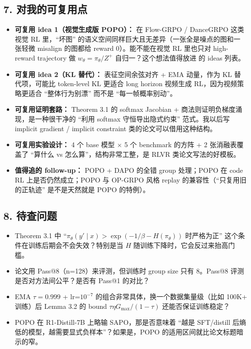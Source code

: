 \subsection{7. 对我的可复用点}

\begin{itemize}[leftmargin=1.5em]
  \item \textbf{可复用 idea 1（视觉生成版 POPO）：} 在 Flow-GRPO / DanceGRPO 这类视觉 RL 里，``坏图'' 的语义空间同样巨大且无差异（一张全是噪点的图和一张轻微 misalign 的图都给 reward 0）。能不能在视觉 RL 里也只对 high-reward trajectory 做 $w_\theta=\pi_\theta/Z^{+}$ 自归一？这个想法值得放进  的 ideas 列表。
  \item \textbf{可复用 idea 2（KL 替代）：} 表征空间余弦对齐 + EMA 动量，作为 KL 替代项，可能比 token-level KL 更适合 long horizon 视频生成 RL，因为视频策略更适合 ``整体行为别漂'' 而不是 ``每一帧概率别动''。
  \item \textbf{可复用证明套路：} Theorem 3.1 的 softmax Jacobian + 商法则证明负梯度涌现，是一种很干净的 ``利用 softmax 守恒导出隐式约束'' 范式。我以后写 implicit gradient / implicit constraint 类的论文可以借用这种结构。
  \item \textbf{可复用实验设计：} 4 个 base 模型 $\times$ 5 个 benchmark 的方阵 + 2 张消融表覆盖了 ``算什么 vs 怎么算''，结构非常工整，是 RLVR 类论文写法的好模板。
  \item \textbf{值得追的 follow-up：} POPO + DAPO 的全错 group 处理；POPO 在 code RL 上是否仍然成立；POPO 与 OP-GRPO 风格 replay 的兼容性（``只复用旧的正轨迹'' 是不是天然就是 POPO 的特例）。
\end{itemize}

\subsection{8. 待查问题}

\begin{itemize}[leftmargin=1.5em]
  \item Theorem 3.1 中 ``$\pi_\theta(y'\mid x)>\exp(-1/\beta-H(\pi_\theta))$ 时严格为正'' 这个条件在训练后期会不会失效？特别是当 $H$ 随训练下降时，它会反过来抬高门槛。
  \item 论文用 Pass@8（n=128）来评测，但训练时 group size 只有 8。Pass@8 评测是否对方法间公平？是否有 Pass@1 的对比？
  \item EMA $\tau=0.999$ + lr=$10^{-7}$ 的组合非常具体，换一个数据集量级（比如 100K+ 训练）后 Lemma 3.2 的 bound $\tau\eta G_{\max}/(1-\tau)$ 还能否保证训练稳定？
  \item POPO 在 R1-Distill-7B 上略输 SAPO，那是否意味着 ``越是 SFT/distill 后熵低的模型，越需要显式负样本''？如果是，POPO 的适用区间就比论文标题暗示的窄。
\end{itemize}

